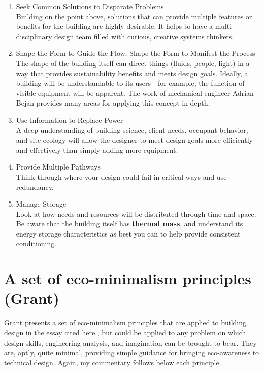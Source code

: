 \documentclass[10pt]{article}
\begin{document}
\begin{enumerate}
      \item Seek Common Solutions to Disparate Problems\\ Building on the point above, solutions that can provide multiple features or benefits for the building are highly desirable. It helps to have a multi-disciplinary design team filled with curious, creative systems thinkers.
      \item Shape the Form to Guide the Flow; Shape the Form to Manifest the Process\\ The shape of the building itself can direct things (fluids, people, light) in a way that provides sustainability benefits and meets design goals. Ideally, a building will be understandable to its users---for example, the function of visible equipment will be apparent. The work of mechanical engineer Adrian Bejan \cite{Bejan2013-jz} provides many areas for applying this concept in depth.
      \item Use Information to Replace Power\\ A deep understanding of building science, client needs, occupant behavior, and site ecology will allow the designer to meet design goals more efficiently and effectively than simply adding more equipment.
      \item Provide Multiple Pathways\\ Think through where your design could fail in critical ways and use redundancy.
      \item Manage Storage\\ Look at how needs and resources will be distributed through time and space. Be aware that the building itself has \textbf{thermal mass}, and understand its energy storage characteristics as best you can to help provide consistent conditioning.
\end{enumerate}

\section{A set of eco-minimalism principles (Grant)}

{}

\medskip


Grant presents a set of eco-minimalism principles that are applied to building design in the essay cited here \cite{Grant2007-yc}, but could be applied to any problem on which design skills, engineering analysis, and imagination can be brought to bear. They are, aptly, quite minimal, providing simple guidance for bringing eco-awareness to technical design. Again, my commentary follows below each principle.
\end{document}
